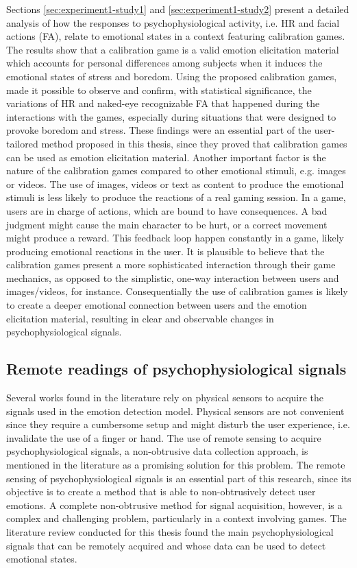 Sections \ref{sec:experiment1-study1} and \ref{sec:experiment1-study2} present a detailed analysis of how the responses to psychophysiological activity, i.e. HR and facial actions (FA), relate to emotional states in a context featuring calibration games. The results show that a calibration game is a valid emotion elicitation material which accounts for personal differences among subjects when it induces the emotional states of stress and boredom. Using the proposed calibration games, made it possible to observe and confirm, with statistical significance, the variations of HR and naked-eye recognizable FA that happened during the interactions with the games, especially during situations that were designed to provoke boredom and stress. These findings were an essential part of the user-tailored method proposed in this thesis, since they proved that calibration games can be used as emotion elicitation material. Another important factor is the nature of the calibration games compared to other emotional stimuli, e.g. images or videos. The use of images, videos or text as content to produce the emotional stimuli is less likely to produce the reactions of a real gaming session. In a game, users are in charge of actions, which are bound to have consequences. A bad judgment might cause the main character to be hurt, or a correct movement might produce a reward. This feedback loop happen constantly in a game, likely producing emotional reactions in the user. It is plausible to believe that the calibration games present a more sophisticated interaction through their game mechanics, as opposed to the simplistic, one-way interaction between users and images/videos, for instance. Consequentially the use of calibration games is likely to create a deeper emotional connection between users and the emotion elicitation material, resulting in clear and observable changes in psychophysiological signals.

\subsection{Remote readings of psychophysiological signals}

Several works found in the literature rely on physical sensors to acquire the signals used in the emotion detection model. Physical sensors are not convenient since they require a cumbersome setup and might disturb the user experience, i.e. invalidate the use of a finger or hand. The use of remote sensing to acquire psychophysiological signals, a non-obtrusive data collection approach, is mentioned in the literature as a promising solution for this problem. The remote sensing of psychophysiological signals is an essential part of this research, since its objective is to create a method that is able to non-obtrusively detect user emotions. A complete non-obtrusive method for signal acquisition, however, is a complex and challenging problem, particularly in a context involving games. The literature review conducted for this thesis found the main psychophysiological signals that can be remotely acquired and whose data can be used to detect emotional states.

